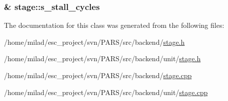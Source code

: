 \label{classstage_a8936cf4c32fa9d9f27ca8d3306468cc8}
\hypertarget{classstage_a257d798bacbed096d4e9879d4d47c207}{
\subsubsection[{s\_\-stall\_\-cycles}]{\& {\bf stage::s\_\-stall\_\-cycles}}}
\label{classstage_a257d798bacbed096d4e9879d4d47c207}


The documentation for this class was generated from the following files:\begin{DoxyCompactItemize}
\item 
/home/milad/esc\_\-project/svn/PARS/src/backend/\hyperlink{stage_8h}{stage.h}\item 
/home/milad/esc\_\-project/svn/PARS/src/backend/unit/\hyperlink{unit_2stage_8h}{stage.h}\item 
/home/milad/esc\_\-project/svn/PARS/src/backend/\hyperlink{stage_8cpp}{stage.cpp}\item 
/home/milad/esc\_\-project/svn/PARS/src/backend/unit/\hyperlink{unit_2stage_8cpp}{stage.cpp}\end{DoxyCompactItemize}
